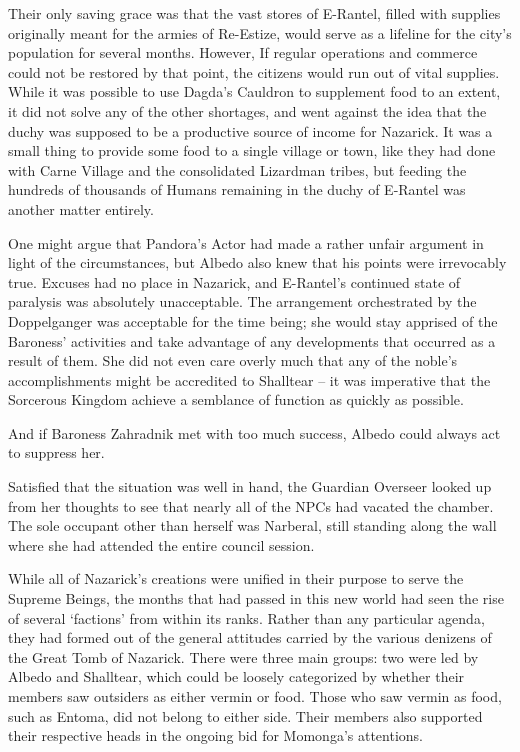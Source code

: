  

Their only saving grace was that the vast stores of E-Rantel, filled with supplies originally meant for the armies of Re-Estize, would serve as a lifeline for the city’s population for several months. However, If regular operations and commerce could not be restored by that point, the citizens would run out of vital supplies. While it was possible to use Dagda’s Cauldron to supplement food to an extent, it did not solve any of the other shortages, and went against the idea that the duchy was supposed to be a productive source of income for Nazarick. It was a small thing to provide some food to a single village or town, like they had done with Carne Village and the consolidated Lizardman tribes, but feeding the hundreds of thousands of Humans remaining in the duchy of E-Rantel was another matter entirely.

 

One might argue that Pandora’s Actor had made a rather unfair argument in light of the circumstances, but Albedo also knew that his points were irrevocably true. Excuses had no place in Nazarick, and E-Rantel’s continued state of paralysis was absolutely unacceptable. The arrangement orchestrated by the Doppelganger was acceptable for the time being; she would stay apprised of the Baroness’ activities and take advantage of any developments that occurred as a result of them. She did not even care overly much that any of the noble’s accomplishments might be accredited to Shalltear – it was imperative that the Sorcerous Kingdom achieve a semblance of function as quickly as possible.

 

And if Baroness Zahradnik met with too much success, Albedo could always act to suppress her.

 

Satisfied that the situation was well in hand, the Guardian Overseer looked up from her thoughts to see that nearly all of the NPCs had vacated the chamber. The sole occupant other than herself was Narberal, still standing along the wall where she had attended the entire council session.

 

While all of Nazarick’s creations were unified in their purpose to serve the Supreme Beings, the months that had passed in this new world had seen the rise of several ‘factions’ from within its ranks. Rather than any particular agenda, they had formed out of the general attitudes carried by the various denizens of the Great Tomb of Nazarick. There were three main groups: two were led by Albedo and Shalltear, which could be loosely categorized by whether their members saw outsiders as either vermin or food. Those who saw vermin as food, such as Entoma, did not belong to either side. Their members also supported their respective heads in the ongoing bid for Momonga’s attentions.

